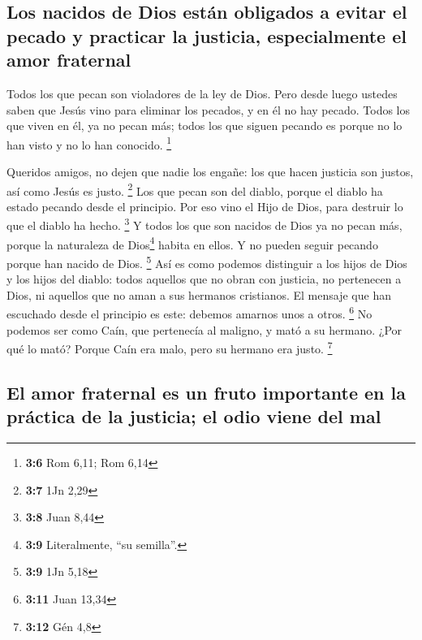 \hypertarget{los-nacidos-de-dios-estuxe1n-obligados-a-evitar-el-pecado-y-practicar-la-justicia-especialmente-el-amor-fraternal}{%
\subsection{Los nacidos de Dios están obligados a evitar el pecado y
practicar la justicia, especialmente el amor
fraternal}\label{los-nacidos-de-dios-estuxe1n-obligados-a-evitar-el-pecado-y-practicar-la-justicia-especialmente-el-amor-fraternal}}

 Todos los que pecan son violadores de la ley de Dios.
 Pero desde luego ustedes saben que Jesús vino para
eliminar los pecados, y en él no hay pecado.  Todos los
que viven en él, ya no pecan más; todos los que siguen pecando es porque
no lo han visto y no lo han conocido. \footnote{\textbf{3:6} Rom 6,11;
  Rom 6,14}

 Queridos amigos, no dejen que nadie los engañe: los que
hacen justicia son justos, así como Jesús es justo. \footnote{\textbf{3:7}
  1Jn 2,29}  Los que pecan son del diablo, porque el
diablo ha estado pecando desde el principio. Por eso vino el Hijo de
Dios, para destruir lo que el diablo ha hecho. \footnote{\textbf{3:8}
  Juan 8,44}  Y todos los que son nacidos de Dios ya no
pecan más, porque la naturaleza de Dios\footnote{\textbf{3:9}
  Literalmente, ``su semilla''.} habita en ellos. Y no pueden seguir
pecando porque han nacido de Dios. \footnote{\textbf{3:9} 1Jn 5,18}
 Así es como podemos distinguir a los hijos de Dios y los
hijos del diablo: todos aquellos que no obran con justicia, no
pertenecen a Dios, ni aquellos que no aman a sus hermanos cristianos.
 El mensaje que han escuchado desde el principio es este:
debemos amarnos unos a otros. \footnote{\textbf{3:11} Juan 13,34}
 No podemos ser como Caín, que pertenecía al maligno, y
mató a su hermano. ¿Por qué lo mató? Porque Caín era malo, pero su
hermano era justo. \footnote{\textbf{3:12} Gén 4,8}

\hypertarget{el-amor-fraternal-es-un-fruto-importante-en-la-pruxe1ctica-de-la-justicia-el-odio-viene-del-mal}{%
\subsection{El amor fraternal es un fruto importante en la práctica de
la justicia; el odio viene del
mal}\label{el-amor-fraternal-es-un-fruto-importante-en-la-pruxe1ctica-de-la-justicia-el-odio-viene-del-mal}}


